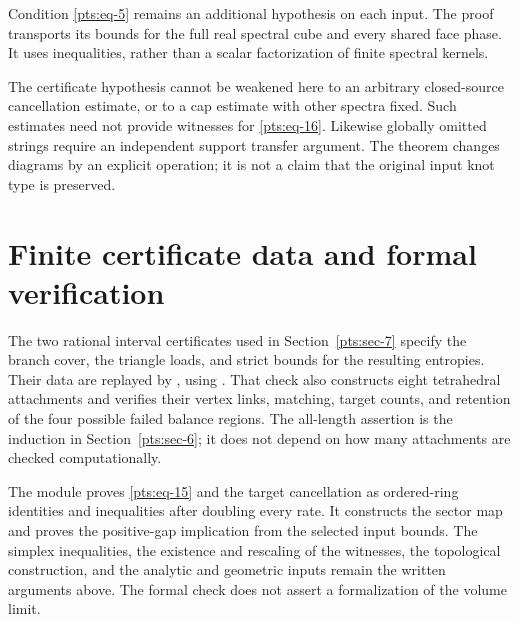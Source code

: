 Condition \eqref{pts:eq-5} remains an additional hypothesis on each
input. The proof transports its bounds for the full real spectral cube
and every shared face phase. It uses inequalities, rather than a scalar
factorization of finite spectral kernels.

The certificate hypothesis cannot be weakened here to an arbitrary
closed-source cancellation estimate, or to a cap estimate with other
spectra fixed. Such estimates need not provide witnesses for \eqref{pts:eq-16}.
Likewise globally omitted strings require an independent support
transfer argument. The theorem changes diagrams by an explicit
operation; it is not a claim that the original input knot type is
preserved.


\section{Finite certificate data and formal verification}

The two rational interval certificates used in
Section~\ref{pts:sec-7} specify the branch cover, the triangle loads,
and strict bounds for the resulting entropies. Their data are replayed
by , using
. That check also constructs eight tetrahedral
attachments and verifies their vertex links, matching, target counts,
and retention of the four possible failed balance regions. The
all-length assertion is the induction in Section~\ref{pts:sec-6}; it
does not depend on how many attachments are checked computationally.

The module  proves
\eqref{pts:eq-15} and the target cancellation as ordered-ring identities
and inequalities after doubling every rate. It constructs the sector
map and proves the positive-gap implication from the selected input
bounds. The simplex inequalities, the existence and rescaling of the
witnesses, the topological construction, and the analytic and geometric
inputs remain the written arguments above. The formal check does not
assert a formalization of the volume limit.

